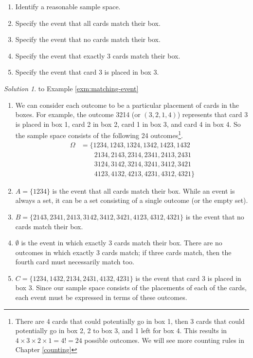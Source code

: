 \documentclass[
]{book}
\providecommand{\tightlist}{%
  \setlength{\itemsep}{0pt}\setlength{\parskip}{0pt}}
\theoremstyle{definition}
\theoremstyle{definition}
\theoremstyle{definition}
\theoremstyle{remark}
\newtheorem*{solution}{Solution}
\begin{document}
\begin{enumerate}
\def\labelenumi{\arabic{enumi}.}
\tightlist
\item
  Identify a reasonable sample space.
\item
  Specify the event that all cards match their box.
\item
  Specify the event that no cards match their box.
\item
  Specify the event that exactly 3 cards match their box.
\item
  Specify the event that card 3 is placed in box 3.
\end{enumerate}

\begin{solution}
{}to Example \ref{exm:matching-event}
\end{solution}

\begin{enumerate}
\def\labelenumi{\arabic{enumi}.}
\tightlist
\item
  We can consider each outcome to be a particular placement of cards in the boxes. For example, the outcome 3214 (or \((3, 2, 1, 4)\)) represents that card 3 is placed in box 1, card 2 in box 2, card 1 in box 3, and card 4 in box 4. So the sample space consists of the following 24 outcomes\footnote{There are 4 cards that could potentially go in box 1, then 3 cards that could potentially go in box 2, 2 to box 3, and 1 left for box 4. This results in \(4\times3\times2\times1=4! = 24\) possible outcomes. We will see more counting rules in Chapter \ref{counting}}.
  \begin{align*}
  \Omega & = \{1234, 1243, 1324, 1342, 1423, 1432 \\
    & \qquad 2134, 2143, 2314, 2341, 2413, 2431 \\
    & \qquad 3124, 3142, 3214, 3241, 3412, 3421 \\
    & \qquad 4123, 4132, 4213, 4231, 4312, 4321\}
  \end{align*}
\item
  \(A=\{1234\}\) is the event that all cards match their box. While an event is always a set, it can be a set consisting of a single outcome (or the empty set).
\item
  \(B=\{2143, 2341, 2413, 3142, 3412, 3421, 4123, 4312, 4321\}\) is the event that no cards match their box.
\item
  \(\emptyset\) is the event in which exactly 3 cards match their box. There are no outcomes in which exactly 3 cards match; if three cards match, then the fourth card must necessarily match too.
\item
  \(C=\{1234, 1432, 2134, 2431, 4132, 4231\}\) is the event that card 3 is placed in box 3. Since our sample space consists of the placements of each of the cards, each event must be expressed in terms of these outcomes.
\end{enumerate}
\end{document}
